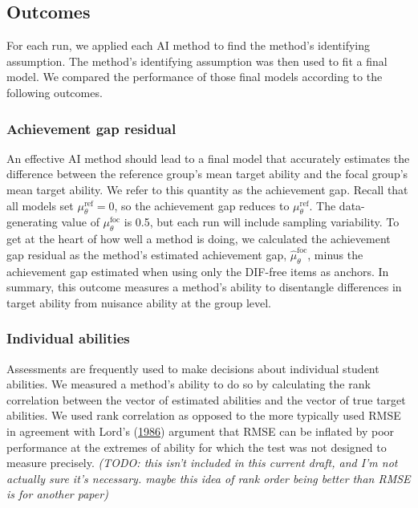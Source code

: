 \documentclass[
  11pt,
]{article}
\begin{document}
\hypertarget{outcomes}{%
\subsection{Outcomes}\label{outcomes}}

For each run, we applied each AI method to find the method's identifying assumption. The method's identifying assumption was then used to fit a final model. We compared the performance of those final models according to the following outcomes.

\hypertarget{achievement-gap-residual}{%
\subsubsection{Achievement gap residual}\label{achievement-gap-residual}}

An effective AI method should lead to a final model that accurately estimates the difference between the reference group's mean target ability and the focal group's mean target ability. We refer to this quantity as the achievement gap. Recall that all models set \(\mu_\theta^\text{ref} = 0\), so the achievement gap reduces to \(\mu_\theta^\text{ref}\). The data-generating value of \(\mu_\theta^\text{foc}\) is 0.5, but each run will include sampling variability. To get at the heart of how well a method is doing, we calculated the achievement gap residual as the method's estimated achievement gap, \(\hat\mu_\theta^\text{foc}\), minus the achievement gap estimated when using only the DIF-free items as anchors. In summary, this outcome measures a method's ability to disentangle differences in target ability from nuisance ability at the group level.

\hypertarget{individual-abilities}{%
\subsubsection{Individual abilities}\label{individual-abilities}}

Assessments are frequently used to make decisions about individual student abilities. We measured a method's ability to do so by calculating the rank correlation between the vector of estimated abilities and the vector of true target abilities. We used rank correlation as opposed to the more typically used RMSE in agreement with Lord's (\protect\hyperlink{ref-lord1986maximum}{1986}) argument that RMSE can be inflated by poor performance at the extremes of ability for which the test was not designed to measure precisely. \emph{(TODO: this isn't included in this current draft, and I'm not actually sure it's necessary. maybe this idea of rank order being better than RMSE is for another paper)}
\end{document}
